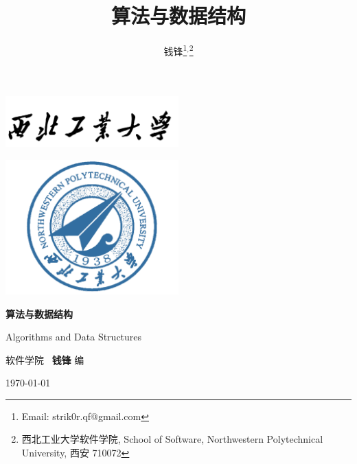 \documentclass[10pt,UTF8]{book} %
\title{\textbf{算法与数据结构}}
\author{钱锋\thanks{Email: strik0r.qf@gmail.com}${}^,$\thanks{
    西北工业大学软件学院, School of Software, Northwestern Polytechnical University, 西安 710072
}}
\begin{document}


\pagestyle{empty}
\begin{titlepage}
    \thispagestyle{empty}
    \centering
        \vspace*{3cm}
        \includegraphics[width=0.5\textwidth]{pic/npu_2.png}\par
        \vspace{1em}
        \includegraphics[width=0.5\textwidth]{pic/npu_1.png}\par
    \vspace*{1em}
        \begin{center}
            \Huge \heiti \textbf{算法与数据结构}

            Algorithms and Data Structures
        \end{center}

        \vspace{14em}
        \begin{center}
        \songti

        \kaishu 软件学院 \, \heiti\textbf{钱锋} \quad \songti 编
        \vspace{0.5em}

    \today
    \end{center}
\end{titlepage}
\cleardoublepage
\maketitle
\cleardoublepage
\frontmatter
\newpage
\pagestyle{plain}
\makeatother

\pagestyle{plain}
{\tableofcontents}
\newpage
\thispagestyle{empty}
\cleardoublepage %
\end{document}
